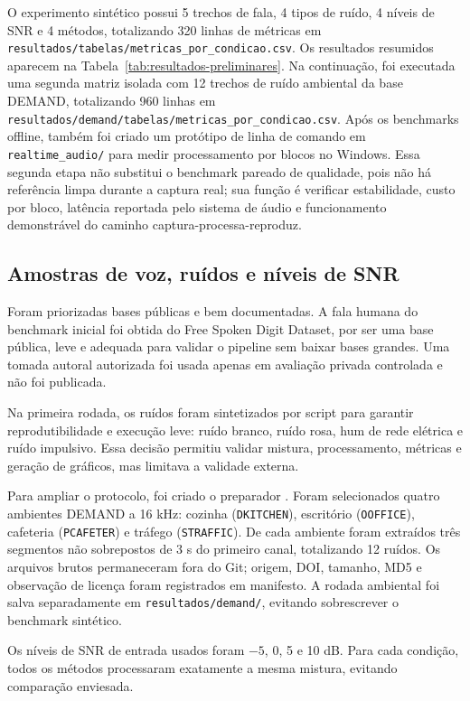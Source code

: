 O experimento sintético possui 5 trechos de fala, 4 tipos de ruído, 4 níveis de SNR e 4 métodos, totalizando 320 linhas de métricas em \texttt{resultados/tabelas/metricas\_por\_condicao.csv}. Os resultados resumidos aparecem na Tabela~\ref{tab:resultados-preliminares}. Na continuação, foi executada uma segunda matriz isolada com 12 trechos de ruído ambiental da base DEMAND, totalizando 960 linhas em \texttt{resultados/demand/tabelas/metricas\_por\_condicao.csv}. Após os benchmarks offline, também foi criado um protótipo de linha de comando em \texttt{realtime\_audio/} para medir processamento por blocos no Windows. Essa segunda etapa não substitui o benchmark pareado de qualidade, pois não há referência limpa durante a captura real; sua função é verificar estabilidade, custo por bloco, latência reportada pelo sistema de áudio e funcionamento demonstrável do caminho captura-processa-reproduz.

\subsection{Amostras de voz, ruídos e níveis de SNR}

Foram priorizadas bases públicas e bem documentadas. A fala humana do benchmark inicial foi obtida do Free Spoken Digit Dataset, por ser uma base pública, leve e adequada para validar o pipeline sem baixar bases grandes. Uma tomada autoral autorizada foi usada apenas em avaliação privada controlada e não foi publicada.

Na primeira rodada, os ruídos foram sintetizados por script para garantir reprodutibilidade e execução leve: ruído branco, ruído rosa, hum de rede elétrica e ruído impulsivo. Essa decisão permitiu validar mistura, processamento, métricas e geração de gráficos, mas limitava a validade externa.

Para ampliar o protocolo, foi criado o preparador . Foram selecionados quatro ambientes DEMAND a 16 kHz: cozinha (\texttt{DKITCHEN}), escritório (\texttt{OOFFICE}), cafeteria (\texttt{PCAFETER}) e tráfego (\texttt{STRAFFIC}). De cada ambiente foram extraídos três segmentos não sobrepostos de 3 s do primeiro canal, totalizando 12 ruídos. Os arquivos brutos permaneceram fora do Git; origem, DOI, tamanho, MD5 e observação de licença foram registrados em manifesto. A rodada ambiental foi salva separadamente em \texttt{resultados/demand/}, evitando sobrescrever o benchmark sintético.

Os níveis de SNR de entrada usados foram \(-5\), 0, 5 e 10 dB. Para cada condição, todos os métodos processaram exatamente a mesma mistura, evitando comparação enviesada.

